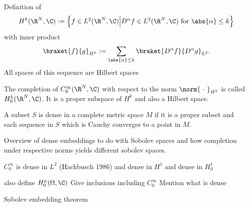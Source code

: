 \begin{defn}
	Definition of 
	\begin{equation}
		H^k(\R^N, \C) := \left\{ f \in L^2(\R^N, \C) \middle| D^\alpha f \in L^2(\R^N, \C) \text{ for $\abs{\alpha} \le k$} \right\}
		\label{eqn:defSobolev}
	\end{equation}
	with inner product
	\[ \braket{f}{g}_{H^k} := \sum_{\abs{\alpha} \le k} \braket{D^\alpha f}{D^\alpha g}_{L^2}. \]
	All spaces of this sequence are Hilbert spaces
\end{defn}

\begin{defn}
	The completion of $C^\infty_0(\R^N, \C)$ with respect to the norm $\norm{~\cdot~}_{H^k}$ is called $H^k_0(\R^N, \C)$. It is a proper subspace of $H^k$ and also a Hilbert space.
\end{defn}

\begin{defn}
	A subset $S$ is dense in a complete metric space $M$ if it is a proper subset
	and each sequence in $S$ which is Cauchy converges to a point in $M$.
\end{defn}

Overview of dense embeddings to do with Sobolev spaces
and how completion under respective norms yields different sobolev spaces.



$C^\infty_0$ is dense in $L^2$ (Hachbusch 1986)
and dense in $H^1$ and dense in $H^1_0$

also define $H_0^n(\Omega, \C)$
Give inclusions including $C^\infty_0$
Mention what is dense

\begin{thm}
	Sobolev embedding theorem
\end{thm}
